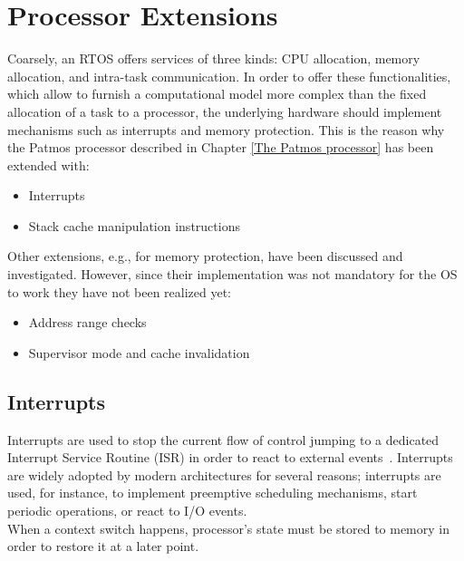 \chapter{Processor Extensions}\label{Processor extensions}

Coarsely, an RTOS offers services of three kinds: CPU allocation, memory allocation, and intra-task communication. In order to offer these functionalities, which allow to furnish a computational model more complex than the fixed allocation of a task to a processor, the underlying hardware should implement mechanisms such as interrupts and memory protection. This is the reason why the Patmos processor described in Chapter \ref{The Patmos processor} has been extended with:

\begin{itemize}
	\item Interrupts
	\item Stack cache manipulation instructions
\end{itemize}

Other extensions, e.g., for memory protection, have been discussed and investigated. However, since their implementation was not mandatory for the OS to work they have not been realized yet:

\begin{itemize}
	\item Address range checks
	\item Supervisor mode and cache invalidation
\end{itemize}

\section{Interrupts}\label{sec:interrupts}

Interrupts are used to stop the current flow of control jumping to a dedicated Interrupt Service Routine (ISR) in order to react to external events~\cite{t-crest:d5.1}. Interrupts are widely adopted by modern architectures for several reasons; interrupts are used, for instance, to implement preemptive scheduling mechanisms, start periodic operations, or react to I/O events.\\ When a context switch happens, processor's state must be stored to memory in order to restore it at a later point.\\

